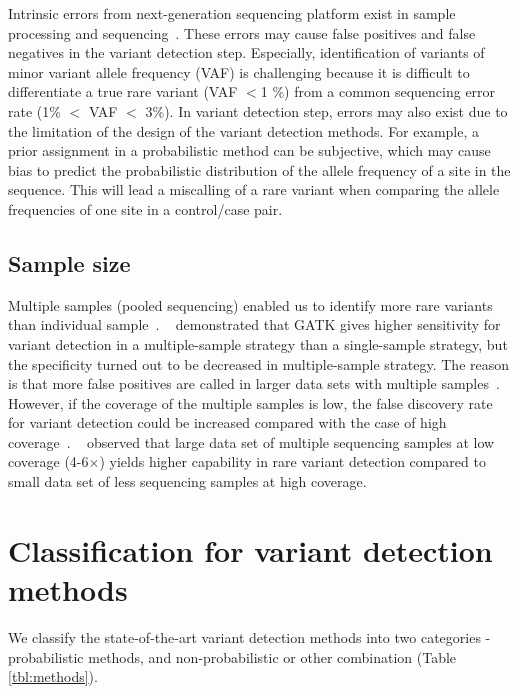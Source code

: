 \documentclass[a4,center,fleqn]{NAR}
\begin{document}
Intrinsic errors from next-generation sequencing platform exist in sample processing and sequencing~\citep{Olson2015}.
These errors may cause false positives and false negatives in the variant detection step.
Especially, identification of variants of minor variant allele frequency (VAF) is challenging because it is difficult to differentiate a true rare variant (VAF $<$1 \%) from a common sequencing error rate (1\% $<$ VAF $<$ 3\%).
In variant detection step, errors may also exist due to the limitation of the design of the variant detection methods.
For example, a prior assignment in a probabilistic method can be subjective, which may cause bias to predict the probabilistic distribution of the allele frequency of a site in the sequence.
This will lead a miscalling of a rare variant when comparing the allele frequencies of one site in a control/case pair.

\subsection{Sample size}

Multiple samples (pooled sequencing) enabled us to identify more rare variants than individual sample~\citep{Bao2014, liu2012steps}.
~\citep{liu2013variant} demonstrated that GATK gives higher sensitivity for variant detection in a multiple-sample strategy than a single-sample strategy, but the specificity turned out to be decreased in multiple-sample strategy.
The reason is that more false positives are called in larger data sets with multiple samples~\citep{Nielsen2011}.
However, if the coverage of the multiple samples is low, the false discovery rate for variant detection could be increased compared with the case of high coverage~\citep{Cheng2014}.
~\citep{le2011snp} observed that large data set of multiple sequencing samples at low coverage (4-6$\times$) yields higher capability in rare variant detection compared to small data set of less sequencing samples at high coverage.


\section{Classification for variant detection methods}

We classify the state-of-the-art variant detection methods into two categories - probabilistic methods, and non-probabilistic or other combination (Table \ref{tbl:methods}).
\end{document}

